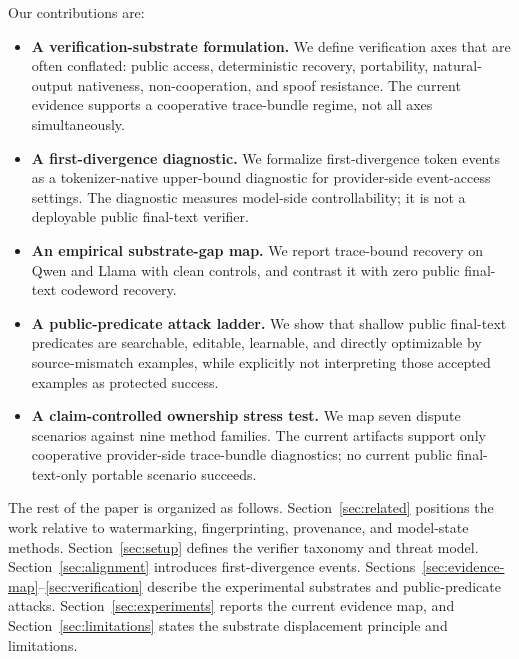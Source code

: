 Our contributions are:
\begin{itemize}
\item \textbf{A verification-substrate formulation.}  We define verification
axes that are often conflated: public access, deterministic recovery,
portability, natural-output nativeness, non-cooperation, and spoof resistance.
The current evidence supports a cooperative trace-bundle regime, not all axes
simultaneously.
\item \textbf{A first-divergence diagnostic.}  We formalize first-divergence
token events as a tokenizer-native upper-bound diagnostic for provider-side
event-access settings.  The diagnostic measures model-side controllability; it
is not a deployable public final-text verifier.
\item \textbf{An empirical substrate-gap map.}  We report trace-bound recovery
on Qwen and Llama with clean controls, and contrast it with zero public
final-text codeword recovery.
\item \textbf{A public-predicate attack ladder.}  We show that shallow public
final-text predicates are searchable, editable, learnable, and directly
optimizable by source-mismatch examples, while explicitly not interpreting
those accepted examples as protected success.
\item \textbf{A claim-controlled ownership stress test.}  We map seven dispute
scenarios against nine method families.  The current artifacts support only
cooperative provider-side trace-bundle diagnostics; no current public
final-text-only portable scenario succeeds.
\end{itemize}

The rest of the paper is organized as follows.  Section~\ref{sec:related}
positions the work relative to watermarking, fingerprinting, provenance, and
model-state methods.  Section~\ref{sec:setup} defines the verifier taxonomy
and threat model.  Section~\ref{sec:alignment} introduces first-divergence
events.  Sections~\ref{sec:evidence-map}--\ref{sec:verification} describe the
experimental substrates and public-predicate attacks.  Section~\ref{sec:experiments}
reports the current evidence map, and Section~\ref{sec:limitations} states the
substrate displacement principle and limitations.
